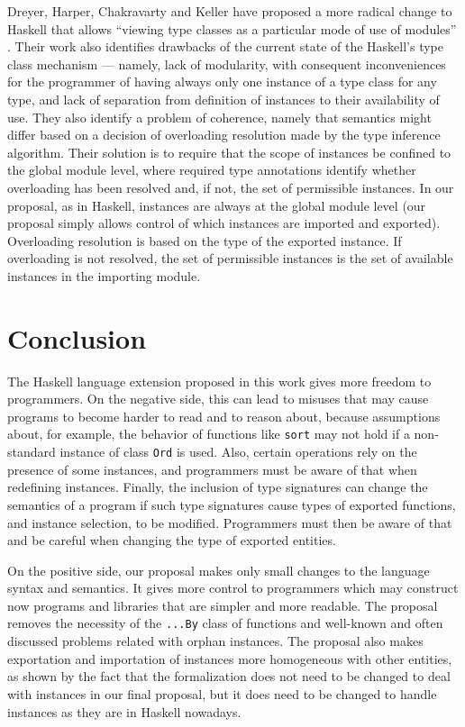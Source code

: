 \documentclass[msc]{ppgccufmg}
\begin{document}
Dreyer, Harper, Chakravarty and Keller have proposed a more radical
change to Haskell that allows ``viewing type classes as a particular
mode of use of modules'' \citep{modular}. Their work also identifies
drawbacks of the current state of the Haskell's type class mechanism
--- namely, lack of modularity, with consequent inconveniences for the
programmer of having always only one instance of a type class for any
type, and lack of separation from definition of instances to their
availability of use. They also identify a problem of coherence, namely
that semantics might differ based on a decision of overloading
resolution made by the type inference algorithm. Their solution is to
require that the scope of instances be confined to the global module
level, where required type annotations identify whether overloading
has been resolved and, if not, the set of permissible instances. In
our proposal, as in Haskell, instances are always at the global module
level (our proposal simply allows control of which instances are
imported and exported). Overloading resolution is based on the type of
the exported instance. If overloading is not resolved, the set of
permissible instances is the set of available instances in the
importing module.

\chapter{Conclusion}

The Haskell language extension proposed in this work gives more
freedom to programmers. On the negative side, this can lead to misuses
that may cause programs to become harder to read and to reason about,
because assumptions about, for example, the behavior of functions like
\texttt{sort} may not hold if a non-standard instance of class
\texttt{Ord} is used.
Also, certain operations rely on the presence of some instances, and
programmers must be aware of that when redefining instances.  Finally,
the inclusion of type signatures can change the semantics of a program
if such type signatures cause types of exported functions, and
instance selection, to be modified. Programmers must then be aware of
that and be careful when changing the type of exported entities.

On the positive side, our proposal makes only small changes to the
language syntax and semantics. It gives more control to programmers
which may construct now programs and libraries that are simpler and
more readable.  The proposal removes the necessity of the
\texttt{...By} class of functions and well-known and often discussed
problems related with orphan instances. The proposal also makes
exportation and importation of instances more homogeneous with other
entities, as shown by the fact that the formalization does not need to
be changed to deal with instances in our final proposal, but it does
need to be changed to handle instances as they are in Haskell
nowadays.
\end{document}
